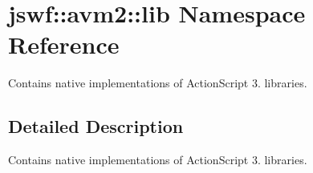 \hypertarget{namespacejswf_1_1avm2_1_1lib}{\section{jswf\+:\+:avm2\+:\+:lib Namespace Reference}
\label{namespacejswf_1_1avm2_1_1lib}
}


Contains native implementations of Action\+Script 3. libraries.  




\subsection{Detailed Description}
Contains native implementations of Action\+Script 3. libraries. 